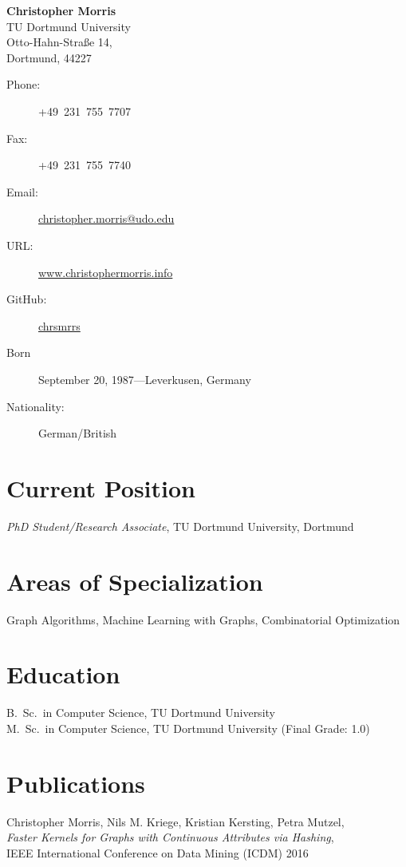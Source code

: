 \documentclass[11pt, a4paper]{scrartcl}
\newcommand{\years}[1]{\marginnote {\bf #1}}
\begin{document}
{\LARGE \bf Christopher Morris}\\[0.5cm] 
TU Dortmund University\\ 
Otto-Hahn-Stra\ss{}e 14,\\
Dortmund, 44227

\begin{description}
	\item[Phone:] 
	+49\ 231~755~7707	
	\item[Fax:] 
	+49~231~755~7740
	\item[Email:] \href{mailto:christopher.morris@udo.edu}{christopher.morris@udo.edu}
	\item[URL:] \href{www.christophermorris.info}{www.christophermorris.info}
	\item[GitHub:] \href{https://github.com/chrsmrrs}{chrsmrrs}
	\item[]\vspace{-0.5em}
	\item[Born] 
	September 20, 1987---Leverkusen, Germany
	\item[Nationality:] 
	German/British 
\end{description}

\section*{Current Position}
\emph{PhD Student/Research Associate}, TU Dortmund University, Dortmund

\section*{Areas of Specialization}
Graph Algorithms, Machine Learning with Graphs, Combinatorial Optimization

\section*{Education}
\years{2012} B.~Sc.~in Computer Science, TU Dortmund University\\
\years{2015} M.~Sc.~in Computer Science, TU Dortmund University (Final Grade: 1.0) 

\section*{Publications}

\years{2016} Christopher Morris, Nils M. Kriege, Kristian Kersting, Petra Mutzel,\\
\emph{Faster Kernels for Graphs with Continuous Attributes via Hashing},\\
IEEE International Conference on Data Mining (ICDM) 2016\\
\end{document}
